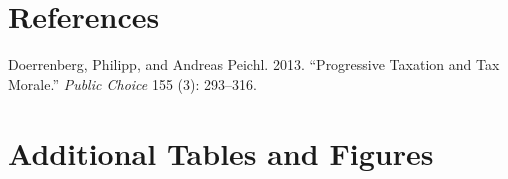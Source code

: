 \documentclass[
  12pt,
]{article}
\newlength{\cslhangindent}
\newlength{\cslentryspacingunit} %
\newenvironment{CSLReferences}[2] %
 {%
  \setlength{\parindent}{0pt}
  \ifodd #1
  \let\oldpar\par
  \def\par{\hangindent=\cslhangindent\oldpar}
  \fi
  \setlength{\parskip}{#2\cslentryspacingunit}
 }%
 {}
\newcommand{\beginsupplement}{\setcounter{table}{0}  \renewcommand{\thetable}{A\arabic{table}}     \setcounter{figure}{0} \renewcommand{\thefigure}{A\arabic{figure}}}
\begin{document}
\hypertarget{references}{%
\section*{References}\label{references}}

\hypertarget{refs}{}
\begin{CSLReferences}{1}{0}
\leavevmode{}%
Doerrenberg, Philipp, and Andreas Peichl. 2013. {``Progressive Taxation and Tax Morale.''} \emph{Public Choice} 155 (3): 293--316.

\end{CSLReferences}

\clearpage

\hypertarget{appendix-appendix}{%
\appendix}


\beginsupplement

\hypertarget{additional-tables-and-figures}{%
\section{Additional Tables and Figures}\label{additional-tables-and-figures}}
\end{document}
